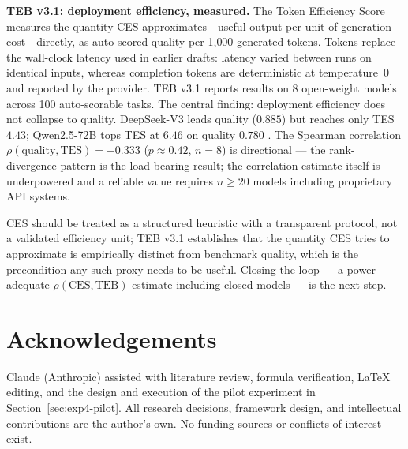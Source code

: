 \documentclass[12pt]{article}
\begin{document}
\textbf{TEB v3.1: deployment efficiency, measured.} The Token Efficiency Score measures the quantity CES approximates---useful output per unit of generation cost---directly, as auto-scored quality per 1{,}000 generated tokens. Tokens replace the wall-clock latency used in earlier drafts: latency varied between runs on identical inputs, whereas completion tokens are deterministic at temperature~0 and reported by the provider. TEB v3.1 reports results on 8 open-weight models across 100 auto-scorable tasks. The central finding: deployment efficiency does not collapse to quality. DeepSeek-V3 leads quality ($0.885$) but reaches only TES $4.43$; Qwen2.5-72B tops TES at $6.46$ on quality $0.780$ . The Spearman correlation $\rho(\mathrm{quality}, \mathrm{TES}) = -0.333$ ($p \approx 0.42$, $n = 8$) is directional --- the rank-divergence pattern is the load-bearing result; the correlation estimate itself is underpowered and a reliable value requires $n \geq 20$ models including proprietary API systems.

CES should be treated as a structured heuristic with a transparent protocol, not a validated efficiency unit; TEB v3.1 establishes that the quantity CES tries to approximate is empirically distinct from benchmark quality, which is the precondition any such proxy needs to be useful. Closing the loop --- a power-adequate $\rho(\mathrm{CES}, \mathrm{TEB})$ estimate including closed models --- is the next step.

\section*{Acknowledgements}

Claude (Anthropic) assisted with literature review, formula verification, LaTeX editing, and the design and execution of the pilot experiment in Section~\ref{sec:exp4-pilot}. All research decisions, framework design, and intellectual contributions are the author's own. No funding sources or conflicts of interest exist.
\end{document}
